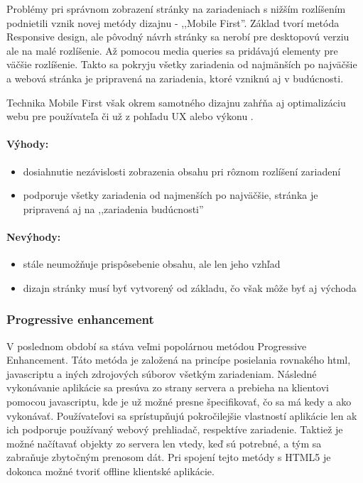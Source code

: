 Problémy pri správnom zobrazení stránky na zariadeniach s nižším rozlíšením podnietili vznik novej metódy dizajnu - ,,Mobile First''. Základ tvorí metóda Responsive design, ale pôvodný návrh stránky sa nerobí pre desktopovú verziu ale na malé rozlíšenie. Až pomocou media queries sa pridávajú elementy pre väčšie rozlíšenie. Takto sa pokryju všetky zariadenia od najmänších po najväčšie a webová stránka je pripravená na zariadenia, ktoré vzniknú aj v budúcnosti.

Technika Mobile First však okrem samotného dizajnu zahŕňa aj optimalizáciu webu pre používateľa či už z pohľadu UX alebo výkonu \cite{mobilefirst}.

\paragraph{Výhody:}
\begin{itemize}
	\item dosiahnutie nezávislosti zobrazenia obsahu pri rôznom rozlíšení zariadení
	\item podporuje všetky zariadenia od najmenších po najväčšie, stránka je pripravená aj na ,,zariadenia budúcnosti''
\end{itemize}

\paragraph{Nevýhody:}
\begin{itemize}
	\item stále neumožňuje prispôsebenie obsahu, ale len jeho vzhľad
	\item dizajn stránky musí byť vytvorený od základu, čo však môže byť aj východa
\end{itemize}


\subsubsection{Progressive enhancement} %
\label{ssub:progressive_enhancement}

V poslednom období sa stáva veľmi popolárnou metódou Progressive Enhancement. Táto metóda je založená na princípe posielania rovnakého html, javascriptu a iných zdrojových súborov všetkým zariadeniam. Následné vykonávanie aplikácie sa presúva zo strany servera a prebieha na klientovi pomocou javascriptu, kde je už možné presne špecifikovať, čo sa má kedy a ako vykonávať. Používateľovi sa sprístupňujú pokročilejšie vlastností aplikácie len ak ich podporuje používaný webový prehliadač, respektíve zariadenie. Taktiež je možné načítavať objekty zo servera len vtedy, keď sú potrebné, a tým sa zabraňuje zbytočným prenosom dát. Pri spojení tejto metódy s HTML5 je dokonca možné tvoriť offline klientské aplikácie.

